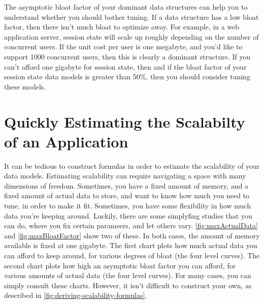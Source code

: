The asymptotic bloat factor of your dominant data structures can help you to
understand whether you should bother tuning. If a data structure has a low bloat
factor, then there isn't much bloat to optimize away. For example, in a web
application server, session state will scale up roughly depending on the number
of concurrent users. If the unit cost per user is one megabyte, and you'd like
to support 1000 concurrent users, then this is clearly a dominant structure. If
you can't afford one gigabyte for session state, then and if the bloat factor of
your session state data models is greater than 50\%, then you should consider
tuning these models.

\section{Quickly Estimating the Scalabilty of an Application}

It can be tedious to construct formulas in order to estimate the scalability of
your data models. Estimating scalability can require navigating a space with
many dimensions of freedom. Sometimes, you have a fixed amount of memory, and a
fixed amount of actual data to store, and want to know how much you need to
tune, in order to make it fit. Sometimes, you have some flexibility in how much
data you're keeping around. Luckily, there are some simplyfing studies that you
can do, where you fix certain parameers, and let others vary.
\autoref{fig:maxActualData} and \autoref{fig:maxBloatFactor} show two of these.
In both cases, the amount of memory available is fixed at one gigabyte. The
first chart plots how much actual data you can afford to keep around, for
various degrees of bloat (the four level curves). The second chart plots how
high an asymptotic bloat factor you can afford, for various amounts of actual
data (the four level curves). For many cases, you can simply consult these
charts. However, it isn't difficult to construct your own, as described in
\autoref{fig:deriving-scalability-formulas}.


